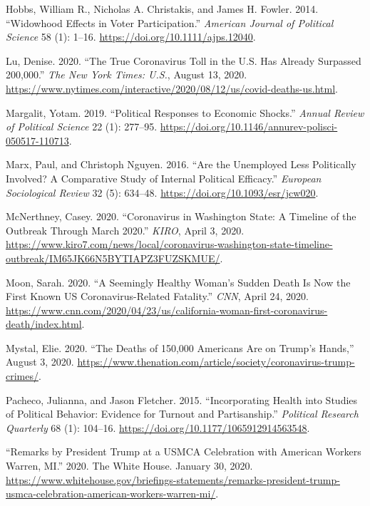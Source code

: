 \documentclass[
  12pt,
]{article}
\newlength{\cslhangindent}
\newenvironment{cslreferences}%
  {\setlength{\parindent}{0pt}%
  \everypar{\setlength{\hangindent}{\cslhangindent}}\ignorespaces}%
  {\par}
\begin{document}
\begin{cslreferences}
\leavevmode\hypertarget{ref-Hobbs2014}{}%
Hobbs, William R., Nicholas A. Christakis, and James H. Fowler. 2014. ``Widowhood Effects in Voter Participation.'' \emph{American Journal of Political Science} 58 (1): 1--16. \url{https://doi.org/10.1111/ajps.12040}.

\leavevmode\hypertarget{ref-Lu2020}{}%
Lu, Denise. 2020. ``The True Coronavirus Toll in the U.S. Has Already Surpassed 200,000.'' \emph{The New York Times: U.S.}, August 13, 2020. \url{https://www.nytimes.com/interactive/2020/08/12/us/covid-deaths-us.html}.

\leavevmode\hypertarget{ref-Margalit2019}{}%
Margalit, Yotam. 2019. ``Political Responses to Economic Shocks.'' \emph{Annual Review of Political Science} 22 (1): 277--95. \url{https://doi.org/10.1146/annurev-polisci-050517-110713}.

\leavevmode\hypertarget{ref-Marx2016}{}%
Marx, Paul, and Christoph Nguyen. 2016. ``Are the Unemployed Less Politically Involved? A Comparative Study of Internal Political Efficacy.'' \emph{European Sociological Review} 32 (5): 634--48. \url{https://doi.org/10.1093/esr/jcw020}.

\leavevmode\hypertarget{ref-McNerthney2020}{}%
McNerthney, Casey. 2020. ``Coronavirus in Washington State: A Timeline of the Outbreak Through March 2020.'' \emph{KIRO}, April 3, 2020. \url{https://www.kiro7.com/news/local/coronavirus-washington-state-timeline-outbreak/IM65JK66N5BYTIAPZ3FUZSKMUE/}.

\leavevmode\hypertarget{ref-Moon2020}{}%
Moon, Sarah. 2020. ``A Seemingly Healthy Woman's Sudden Death Is Now the First Known US Coronavirus-Related Fatality.'' \emph{CNN}, April 24, 2020. \url{https://www.cnn.com/2020/04/23/us/california-woman-first-coronavirus-death/index.html}.

\leavevmode\hypertarget{ref-Mystal2020}{}%
Mystal, Elie. 2020. ``The Deaths of 150,000 Americans Are on Trump's Hands,'' August 3, 2020. \url{https://www.thenation.com/article/society/coronavirus-trump-crimes/}.

\leavevmode\hypertarget{ref-Pacheco2015}{}%
Pacheco, Julianna, and Jason Fletcher. 2015. ``Incorporating Health into Studies of Political Behavior: Evidence for Turnout and Partisanship.'' \emph{Political Research Quarterly} 68 (1): 104--16. \url{https://doi.org/10.1177/1065912914563548}.

\leavevmode\hypertarget{ref-whitehouse2020}{}%
``Remarks by President Trump at a USMCA Celebration with American Workers \textbar{} Warren, MI.'' 2020. The White House. January 30, 2020. \url{https://www.whitehouse.gov/briefings-statements/remarks-president-trump-usmca-celebration-american-workers-warren-mi/}.


\end{cslreferences}
\end{document}
